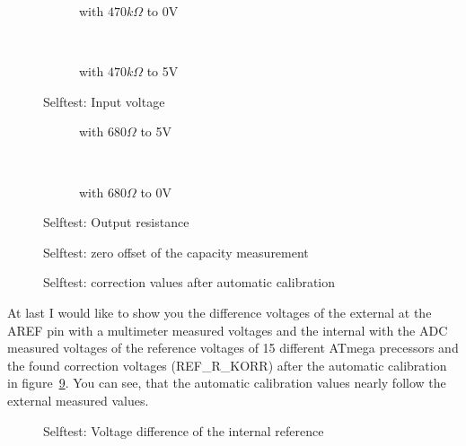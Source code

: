 \begin{figure}[H]
  \begin{subfigure}[b]{9cm}
  \centering
    \resizebox{9cm}{!}{}
    \caption{with \(470 k\Omega\) to 0V}
    \label{fig:SelfTlowH}
  \end{subfigure}
  ~
  \begin{subfigure}[b]{9cm}
  \centering
    \resizebox{9cm}{!}{}
    \caption{with \(470 k\Omega\) to 5V}
    \label{fig:SelfTtopH}
  \end{subfigure}
  \caption{Selftest: Input voltage}
\end{figure}

\begin{figure}[H]
  \begin{subfigure}[b]{9cm}
  \centering
    \resizebox{9cm}{!}{}
    \caption{with \(680 \Omega\) to 5V}
    \label{fig:SelfTRoL}
  \end{subfigure}
  ~
  \begin{subfigure}[b]{9cm}
  \centering
    \resizebox{9cm}{!}{}
    \caption{with \(680 \Omega\) to 0V}
    \label{fig:SelfTRoH}
  \end{subfigure}
  \caption{Selftest: Output resistance}
\end{figure}

\begin{figure}[H]
  \centering
  \resizebox{9cm}{!}{}
  \caption{Selftest: zero offset of the capacity measurement}
  \label{fig:SelfTcap}
\end{figure}

\begin{figure}[H]
  \centering
  \resizebox{9cm}{!}{}
  \caption{Selftest: correction values after automatic calibration}
  \label{fig:SelfTrefKorr}
\end{figure}

At last I would like to show you the difference voltages of the external at the
AREF pin with a multimeter measured voltages and the internal with the ADC
measured voltages of the reference voltages of 15 different ATmega precessors
and the found correction voltages (REF\_R\_KORR) after the automatic calibration in
figure~\ref{fig:SelfTrefDiff}.
You can see, that the automatic calibration values nearly follow the external measured values.

\begin{figure}[H]
  \centering
  \resizebox{9cm}{!}{}
  \caption{Selftest: Voltage difference of the internal reference}
  \label{fig:SelfTrefDiff}
\end{figure}

